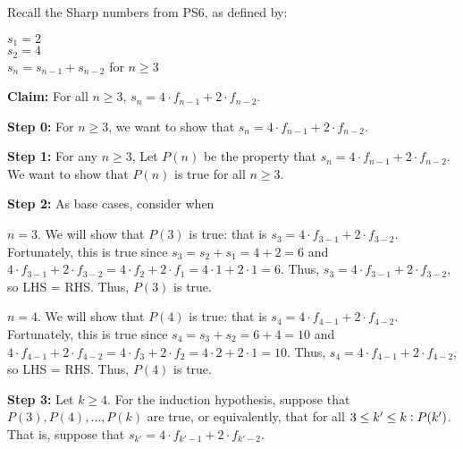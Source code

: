 \documentclass{article}
\begin{document}
\noindent Recall the Sharp numbers from PS6, as defined by:
\begin{center}
    \begin{minipage}{0.5\textwidth} %
        \raggedright %
		$s_1=2$ \\
		$s_2=4$ \\
		$s_n=s_{n-1}+s_{n-2}$ for $n\geq 3$
    \end{minipage}
\end{center}
\vspace{15pt}

\noindent\textbf{Claim:} For all $n\geq 3$, $s_n=4\cdot f_{n-1}+2\cdot f_{n-2}$.

\vspace{15pt}

\noindent\textbf{Step 0:} For $n\geq 3$, we want to show that $s_n=4\cdot f_{n-1}+2\cdot f_{n-2}$.
\vspace{15pt}

\noindent\textbf{Step 1:} For any $n\geq 3$, Let $P(n)$ be the property that $s_n=4\cdot f_{n-1}+2\cdot f_{n-2}$.
\vspace{5pt}
We want to show that $P(n)$ is true for all $n\geq 3$.

\vspace{15pt}

\noindent\textbf{Step 2:} As base cases, consider when\vspace{10pt}

$n=3$. We will show that $P(3)$ is true: that is $s_3=4\cdot f_{3-1}+2\cdot f_{3-2}$. Fortunately, this is true since $s_3=s_2+s_1=4+2=6$ and $4\cdot f_{3-1}+2\cdot f_{3-2}=4\cdot f_2+2\cdot f_1=4\cdot 1+2\cdot 1=6$. Thus, $s_3=4\cdot f_{3-1}+2\cdot f_{3-2}$, so LHS = RHS. Thus, $P(3)$ is true.

\vspace{5pt}
$n=4$. We will show that $P(4)$ is true: that is $s_4=4\cdot f_{4-1}+2\cdot f_{4-2}$. Fortunately, this is true since $s_4=s_3+s_2=6+4=10$ and $4\cdot f_{4-1}+2\cdot f_{4-2}=4\cdot f_3+2\cdot f_2=4\cdot 2+2\cdot 1=10$. Thus, $s_4=4\cdot f_{4-1}+2\cdot f_{4-2}$, so LHS = RHS. Thus, $P(4)$ is true.


\vspace{15pt}


\noindent\textbf{Step 3:} Let $k\geq 4$. For the induction hypothesis, suppose that $P(3),P(4),\ldots,P(k)$ are true, or equivalently, that for all $3\leq k'\leq k\vcentcolon P(k')$. That is, suppose that $s_{k'}=4\cdot f_{k'-1}+2\cdot f_{k'-2}$.
\vspace{15pt}
\end{document}
